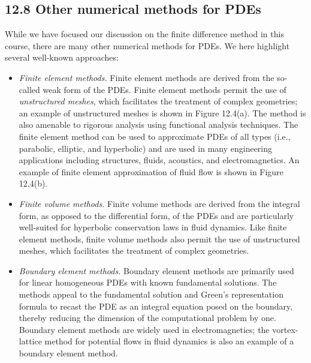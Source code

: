 \subsection{12.8 Other numerical methods for PDEs}
While we have focused our discussion on the finite difference method in this course, there are many other numerical methods for PDEs. We here highlight several well-known approaches:
\begin{itemize}
    \item \textit{Finite element methods.} Finite element methods are derived from the so-called weak form of the PDEs. Finite element methods permit the use of \textit{unstructured meshes}, which facilitates the treatment of complex geometries; an example of unstructured meshes is shown in Figure 12.4(a). The method is also amenable to rigorous analysis using functional analysis techniques. The finite element method can be used to approximate PDEs of all types (i.e., parabolic, elliptic, and hyperbolic) and are used in many engineering applications including structures, fluids, acoustics, and electromagnetics. An example of finite element approximation of fluid flow is shown in Figure 12.4(b).
    \item \textit{Finite volume methods.} Finite volume methods are derived from the integral form, as opposed to the differential form, of the PDEs and are particularly well-suited for hyperbolic conservation laws in fluid dynamics. Like finite element methods, finite volume methods also permit the use of unstructured meshes, which facilitates the treatment of complex geometries.
    \item \textit{Boundary element methods.} Boundary element methods are primarily used for linear homogeneous PDEs with known fundamental solutions. The methods appeal to the fundamental solution and Green's representation formula to recast the PDE as an integral equation posed on the boundary, thereby reducing the dimension of the computational problem by one. Boundary element methods are widely used in electromagnetics; the vortex-lattice method for potential flows in fluid dynamics is also an example of a boundary element method.
\end{itemize}


